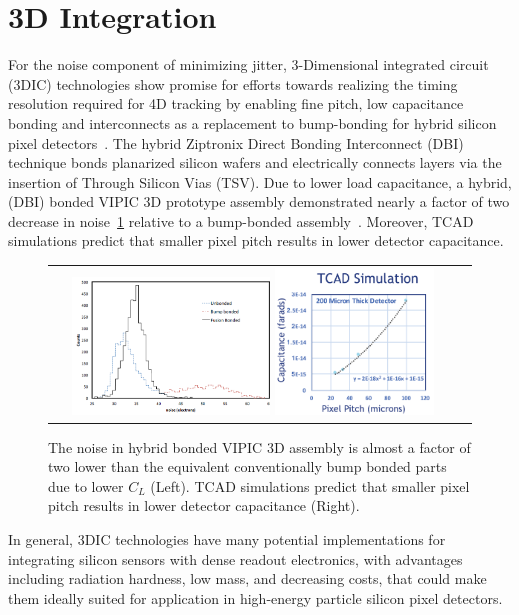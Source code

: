 \section{3D Integration}
For the noise component of minimizing jitter, 3-Dimensional integrated circuit (3DIC) technologies show promise for efforts towards realizing the timing resolution required for 4D tracking by enabling fine pitch, low capacitance bonding and interconnects as a replacement to bump-bonding for hybrid silicon pixel detectors~\cite{7167712,7027258}. 
The hybrid Ziptronix Direct Bonding Interconnect (DBI) technique bonds planarized silicon wafers and electrically connects layers via the insertion of Through Silicon Vias (TSV). 
Due to lower load capacitance, a hybrid, (DBI) bonded VIPIC 3D prototype assembly demonstrated nearly a factor of two decrease in noise~\ref{FusionBondedNoise_PixelPitchCapacitance} relative to a bump-bonded assembly~\cite{Lipton:2018mqk}.  
Moreover, TCAD simulations predict that smaller pixel pitch results in lower detector capacitance.
\begin{figure}[h]
  \begin{center}
    \begin{tabular}{cc}
        \includegraphics[width=0.5\textwidth]{fig_FastTiming/FusionBondedNoise.png}
        \includegraphics[width=0.4\textwidth]{fig_FastTiming/PixelPitch_Capacitance.png}
    \end{tabular}
    \caption{The noise in hybrid bonded VIPIC 3D assembly is almost a factor of two lower than the equivalent conventionally bump bonded parts due to lower $C_L$ (Left).
            TCAD simulations predict that smaller pixel pitch results in lower detector capacitance (Right).
            }            
    \label{FusionBondedNoise_PixelPitchCapacitance}
  \end{center}
\end{figure}
In general, 3DIC technologies have many potential implementations for integrating silicon sensors with dense readout electronics, with advantages including radiation hardness, low mass, and decreasing costs, that could make them ideally suited for application in high-energy particle silicon pixel detectors.

